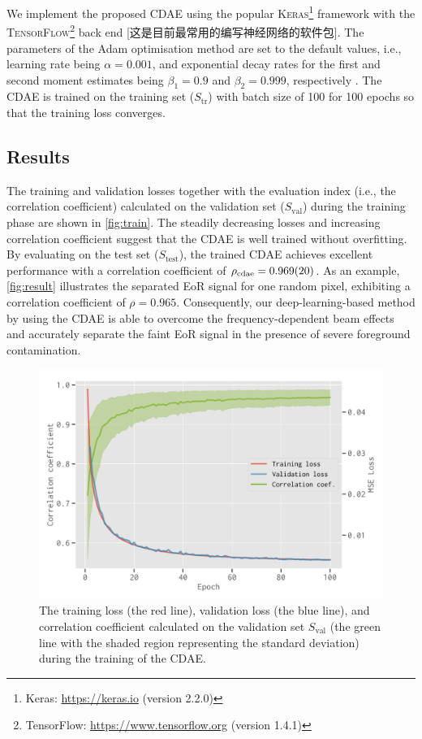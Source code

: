 \documentclass[letters,a4paper,fleqn,usenatbib]{mnras}
\newcommand{\R}[1]{\mathrm{#1}}
\begin{document}
We implement the proposed CDAE using the popular \textsc{Keras}\footnote{%
  Keras: \url{https://keras.io} (version 2.2.0)}
framework \citep{keras} with the \textsc{TensorFlow}\footnote{%
TensorFlow: \url{https://www.tensorflow.org} (version 1.4.1)}
back end \citep{tensorflow} [这是目前最常用的编写神经网络的软件包].
The parameters of the Adam optimisation method are set to the default
values, i.e., learning rate being $\alpha = 0.001$, and
exponential decay rates for the first and second moment estimates being
$\beta_1 = 0.9$ and $\beta_2 = 0.999$, respectively \citep{kingma2015}.
The CDAE is trained on the training set ($S_{\R{tr}}$) with batch size
of 100 for 100 epochs so that the training loss converges.


\subsection{Results}
\label{sec:results}

The training and validation losses together with the evaluation index
(i.e., the correlation coefficient) calculated on the validation set
($S_{\R{val}}$) during the training phase are shown in \autoref{fig:train}.
The steadily decreasing losses and increasing correlation coefficient
suggest that the CDAE is well trained without overfitting.
By evaluating on the test set ($S_{\R{test}}$), the trained CDAE
achieves excellent performance with a correlation coefficient of
$\rho_{\R{cdae}} = \num{0.969 +- 0.020}$.
As an example, \autoref{fig:result} illustrates the separated EoR signal
for one random pixel, exhibiting a correlation coefficient of
$\rho = 0.965$.
Consequently, our deep-learning-based method by using the CDAE is able
to overcome the frequency-dependent beam effects and accurately separate
the faint EoR signal in the presence of severe foreground contamination.

\begin{figure}
  \centering
  \includegraphics[width=\columnwidth]{cdae-train}
  \caption{\label{fig:train}%
    The training loss (the red line), validation loss (the blue line),
    and correlation coefficient calculated on the validation set
    $S_{\R{val}}$ (the green line with the shaded region representing
    the standard deviation) during the training of the CDAE.
  }
\end{figure}
\end{document}
